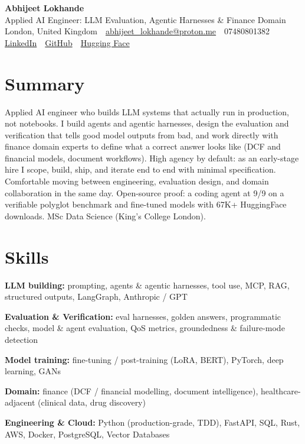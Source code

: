 \documentclass[10pt,a4paper]{article}
\newcommand{\sep}{\,\textcolor{accent!60}{\textbar}\,}
\begin{document}
\begin{center}
  {\fontsize{24}{26}\selectfont\bfseries Abhijeet Lokhande}\\[3pt]
  {\color{accent}\large Applied AI Engineer: LLM Evaluation, Agentic Harnesses \& Finance Domain}\\[5pt]
  {\small
    London, United Kingdom \sep
    \href{mailto:abhijeet_lokhande@proton.me}{abhijeet\_lokhande@proton.me} \sep
    07480801382 \\[2pt]
    \href{https://www.linkedin.com/in/ablds/}{LinkedIn} \sep
    \href{https://github.com/abhijeetscode}{GitHub} \sep
    \href{https://huggingface.co/ab-ai}{Hugging Face}
  }
\end{center}
\vspace{2pt}

\section{Summary}
Applied AI engineer who builds LLM systems that actually run in production, not notebooks. I build agents and agentic harnesses, design the evaluation and verification that tells good model outputs from bad, and work directly with finance domain experts to define what a correct answer looks like (DCF and financial models, document workflows). High agency by default: as an early-stage hire I scope, build, ship, and iterate end to end with minimal specification. Comfortable moving between engineering, evaluation design, and domain collaboration in the same day. Open-source proof: a coding agent at 9/9 on a verifiable polyglot benchmark and fine-tuned models with 67K+ HuggingFace downloads. MSc Data Science (King's College London).

\section{Skills}
\begin{tight}
  \item[\textcolor{accent}{\small$\bullet$}] \textbf{LLM building:} prompting, agents \& agentic harnesses, tool use, MCP, RAG, structured outputs, LangGraph, Anthropic / GPT
  \item[\textcolor{accent}{\small$\bullet$}] \textbf{Evaluation \& Verification:} eval harnesses, golden answers, programmatic checks, model \& agent evaluation, QoS metrics, groundedness \& failure-mode detection
  \item[\textcolor{accent}{\small$\bullet$}] \textbf{Model training:} fine-tuning / post-training (LoRA, BERT), PyTorch, deep learning, GANs
  \item[\textcolor{accent}{\small$\bullet$}] \textbf{Domain:} finance (DCF / financial modelling, document intelligence), healthcare-adjacent (clinical data, drug discovery)
  \item[\textcolor{accent}{\small$\bullet$}] \textbf{Engineering \& Cloud:} Python (production-grade, TDD), FastAPI, SQL, Rust, AWS, Docker, PostgreSQL, Vector Databases
\end{tight}
\end{document}
